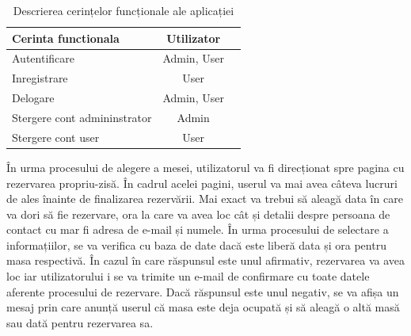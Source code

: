 \documentclass[a4paper,12pt]{book}
\begin{document}
\begin{table}[htb]
\caption{Descrierea cerințelor funcționale ale aplicației}

    \centering          %
  \begin{tabular}{|l|c|c|} %
    \hline
    \textbf{Cerinta functionala} & \textbf{Utilizator}  \\ 
    \hline %
    Autentificare & Admin, User  \\
    \hline
   Inregistrare & User  \\
   \hline
   Delogare & Admin, User  \\
    \hline
    Stergere cont admininstrator & Admin  \\
    \hline
     Stergere cont user & User   \\
    \hline
  \end{tabular}
  \label{tab:tabel-cerinte}
\end{table}
În urma procesului de alegere a mesei, utilizatorul va fi direcționat spre pagina cu rezervarea propriu-zisă. În cadrul acelei pagini, userul va mai avea câteva lucruri de ales înainte de finalizarea rezervării. Mai exact va trebui să aleagă data în care va dori să fie rezervare, ora la care va avea loc cât și detalii despre persoana de contact cu mar fi adresa de e-mail și numele. În urma procesului de selectare a informațiilor, se va verifica cu baza de date dacă este liberă data și ora pentru masa respectivă. În cazul în care răspunsul este unul afirmativ, rezervarea va avea loc iar utilizatorului i se va trimite un e-mail de confirmare cu toate datele aferente procesului de rezervare. Dacă răspunsul este unul negativ, se va afișa un mesaj prin care anunță userul că masa este deja ocupată și să aleagă o altă masă sau dată pentru rezervarea sa. 


\printbibliography[heading=bibintoc]
\end{document}
